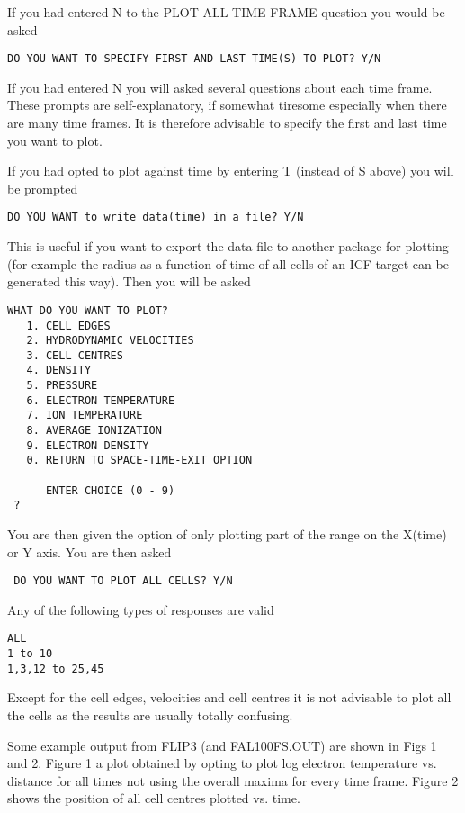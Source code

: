 If you had entered N to the PLOT ALL TIME FRAME
question you would be asked 
\begin{verbatim}
DO YOU WANT TO SPECIFY FIRST AND LAST TIME(S) TO PLOT? Y/N
\end{verbatim}
If you had entered N you will asked 
several questions about each
time frame. These prompts
are self-explanatory, if somewhat tiresome especially when there are many time frames.
It is therefore advisable to specify the first and last time you want to plot.

\newline 
If you had opted to plot against time by entering T (instead of S above)  you will be prompted
\begin{verbatim}
DO YOU WANT to write data(time) in a file? Y/N
\end{verbatim}
This is useful if you want to export the data file to another package for plotting
(for example the radius as a function of time of all cells of an ICF target can be generated this way).
Then you will be asked
\begin{verbatim}
WHAT DO YOU WANT TO PLOT?
   1. CELL EDGES
   2. HYDRODYNAMIC VELOCITIES
   3. CELL CENTRES
   4. DENSITY
   5. PRESSURE
   6. ELECTRON TEMPERATURE
   7. ION TEMPERATURE
   8. AVERAGE IONIZATION
   9. ELECTRON DENSITY
   0. RETURN TO SPACE-TIME-EXIT OPTION

      ENTER CHOICE (0 - 9)
 ?
\end{verbatim}
You are then given the option of only plotting part of the
range on the X(time) or Y axis. You are then asked
\begin{verbatim}
 DO YOU WANT TO PLOT ALL CELLS? Y/N
\end{verbatim}
Any of the following types of responses are valid
\begin{verbatim}
ALL
1 to 10
1,3,12 to 25,45
\end{verbatim}
Except for the cell edges, velocities and cell centres it is not
advisable to plot all the cells as the results are usually
totally confusing.

Some example output from FLIP3 (and FAL100FS.OUT) are shown in Figs 1 and 2. Figure 1 a plot obtained by
opting to plot log electron temperature vs. distance for all times not using the overall maxima for 
every time frame. Figure 2 shows the position of all cell centres plotted vs. time.
 
